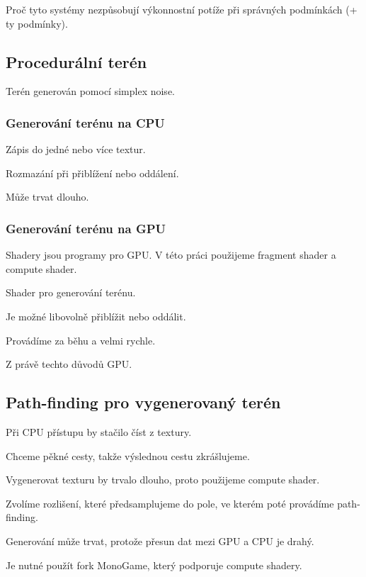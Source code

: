 Proč tyto systémy nezpůsobují výkonnostní potíže při správných podmínkách (+ ty podmínky).

\subsection{Procedurální terén}
Terén generován pomocí simplex noise.

\subsubsection{Generování terénu na CPU}
Zápis do jedné nebo více textur.

Rozmazání při přiblížení nebo oddálení.

Může trvat dlouho.

\subsubsection{Generování terénu na GPU}
Shadery jsou programy pro GPU. V této práci použijeme fragment shader a compute shader.

Shader pro generování terénu.

Je možné libovolně přiblížit nebo oddálit.

Provádíme za běhu a velmi rychle.

Z právě techto důvodů GPU.

\subsection{Path-finding pro vygenerovaný terén}
Při CPU přístupu by stačilo číst z textury.

Chceme pěkné cesty, takže výslednou cestu zkrášlujeme.

Vygenerovat texturu by trvalo dlouho, proto použijeme compute shader.

Zvolíme rozlišení, které předsamplujeme do pole, ve kterém poté provádíme path-finding.

Generování může trvat, protože přesun dat mezi GPU a CPU je drahý.

Je nutné použít fork MonoGame, který podporuje compute shadery.














